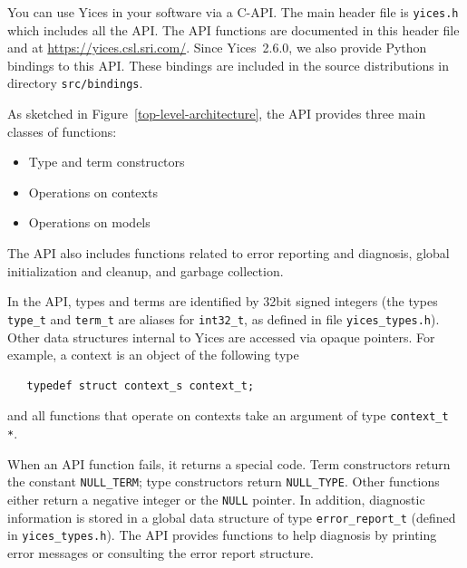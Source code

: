 \documentclass[11pt,twoside,fleqn,openright,titlepage]{cslreport}
\begin{document}

You can use Yices in your software via a C-API. The main header file
is \texttt{yices.h} which includes all the API. The API functions are
documented in this header file and at
\url{https://yices.csl.sri.com/}. Since Yices~2.6.0, we also provide
Python bindings to this API. These bindings are included in the source
distributions in directory \texttt{src/bindings}.

As sketched in Figure~\ref{top-level-architecture}, the API provides
three main classes of functions:
\begin{itemize}
\item Type and term constructors
\item Operations on contexts
\item Operations on models
\end{itemize}
The API also includes functions related to error reporting and
diagnosis, global initialization and cleanup, and garbage collection.

In the API, types and terms are identified by 32bit signed integers
(the types \texttt{type\_t} and \texttt{term\_t} are aliases for
\texttt{int32\_t}, as defined in file \texttt{yices\_types.h}). Other
data structures internal to Yices are accessed via opaque
pointers. For example, a context is an object of the following type
\begin{small}
\begin{verbatim}
   typedef struct context_s context_t;
\end{verbatim}
\end{small}
and all functions that operate on contexts take an argument of type
\texttt{context\_t *}.

When an API function fails, it returns a special code. Term
constructors return the constant \texttt{NULL\_TERM}; type
constructors return \texttt{NULL\_TYPE}. Other functions either return
a negative integer or the \texttt{NULL} pointer. In addition,
diagnostic information is stored in a global data structure of type
\texttt{error\_report\_t} (defined in \texttt{yices\_types.h}). The API
provides functions to help diagnosis by printing error messages or
consulting the error report structure.
\end{document}
